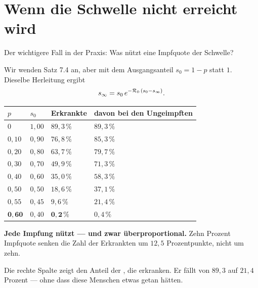 \section{Wenn die Schwelle nicht erreicht wird}

Der wichtigere Fall in der Praxis: Was nützt eine Impfquote  der Schwelle?

\begin{merksatz}
Wir wenden Satz 7.4 an, aber mit dem Ausgangsanteil $s_0 = 1-p$ statt $1$. Dieselbe Herleitung ergibt
\[ s_\infty = s_0\,e^{-\mathcal{R}_0\,(s_0 - s_\infty)} . \]

\begin{center}
{\small
\renewcommand{\arraystretch}{1.48}
\begin{tabular}{@{}P{1.4cm}P{1.6cm}P{2.2cm}P{2.6cm}@{}}
\toprule
$p$ & $s_0$ & \textbf{Erkrankte} & \textbf{davon bei den Ungeimpften}\\
\midrule
$0$ & $1{,}00$ & $89{,}3\,\%$ & $89{,}3\,\%$\\
$0{,}10$ & $0{,}90$ & $76{,}8\,\%$ & $85{,}3\,\%$\\
$0{,}20$ & $0{,}80$ & $63{,}7\,\%$ & $79{,}7\,\%$\\
$0{,}30$ & $0{,}70$ & $49{,}9\,\%$ & $71{,}3\,\%$\\
$0{,}40$ & $0{,}60$ & $35{,}0\,\%$ & $58{,}3\,\%$\\
$0{,}50$ & $0{,}50$ & $18{,}6\,\%$ & $37{,}1\,\%$\\
$0{,}55$ & $0{,}45$ & $9{,}6\,\%$ & $21{,}4\,\%$\\
$\mathbf{0{,}60}$ & $0{,}40$ & $\mathbf{0{,}2\,\%}$ & $0{,}4\,\%$\\
\bottomrule
\end{tabular}}
\end{center}

\begin{center}
\begin{minipage}{0.9\textwidth}
\textbf{Jede Impfung nützt --- und zwar überproportional.} Zehn Prozent Impfquote senken die Zahl der Erkrankten um $12{,}5$ Prozentpunkte, nicht um zehn.
\end{minipage}
\end{center}

Die rechte Spalte zeigt den Anteil der , die erkranken. Er fällt von $89{,}3$ auf $21{,}4$ Prozent --- ohne dass diese Menschen etwas getan hätten.


\end{merksatz}

